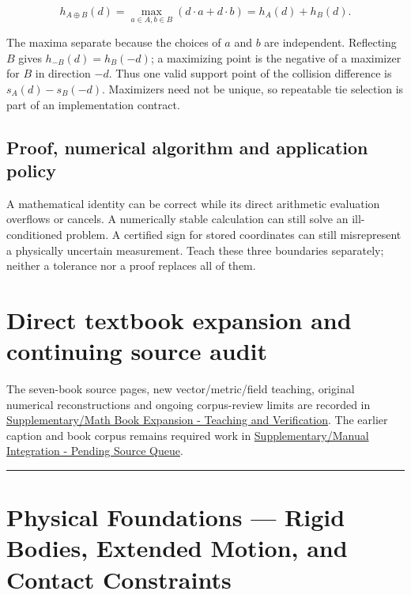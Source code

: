\[
h_{A\oplus B}(d)=\max_{a\in A,b\in B}(d\cdot a+d\cdot b)
=h_A(d)+h_B(d).
\]

The maxima separate because the choices of \(a\) and \(b\) are independent. Reflecting \(B\) gives \(h_{-B}(d)=h_B(-d)\); a maximizing point is the negative of a maximizer for \(B\) in direction \(-d\). Thus one valid support point of the collision difference is \(s_A(d)-s_B(-d)\). Maximizers need not be unique, so repeatable tie selection is part of an implementation contract.

\subsection{Proof, numerical algorithm and application policy}\label{02-foundations-ii-ch039-proof-numerical-algorithm-and-application-policy}

A mathematical identity can be correct while its direct arithmetic evaluation overflows or cancels. A numerically stable calculation can still solve an ill-conditioned problem. A certified sign for stored coordinates can still misrepresent a physically uncertain measurement. Teach these three boundaries separately; neither a tolerance nor a proof replaces all of them.

\section{Direct textbook expansion and continuing source audit}\label{02-foundations-ii-ch039-direct-textbook-expansion-and-continuing-source-audit}

The seven-book source pages, new vector/metric/field teaching, original numerical reconstructions and ongoing corpus-review limits are recorded in \hyperref[appendix-5056f3debc1f]{Supplementary/Math Book Expansion - Teaching and Verification}. The earlier caption and book corpus remains required work in \hyperref[appendix-ac1f51db5e9a]{Supplementary/Manual Integration - Pending Source Queue}.

\begin{center}\rule{0.5\linewidth}{0.5pt}\end{center}

\section{Physical Foundations --- Rigid Bodies, Extended Motion, and Contact Constraints}\label{02-foundations-ii-ch039-physical-foundations-rigid-bodies-extended-motion-and-contact-constraints}

